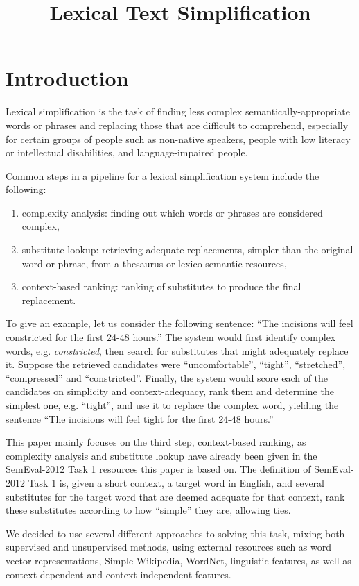 \documentclass[10pt, a4paper]{article}
\title{Lexical Text Simplification}
\begin{document}
\maketitleabstract

\section{Introduction}

Lexical simplification is the task of finding  less complex semantically-appropriate words or phrases and replacing those that are difficult to comprehend, especially for certain groups of people such as non-native speakers, people with low literacy or intellectual disabilities, and language-impaired people.

Common steps in a pipeline for a lexical simplification system include the following:
\begin{enumerate}
\item complexity analysis: finding out which words or phrases are considered complex,
\item substitute lookup: retrieving adequate replacements, simpler than the original word or phrase, from a thesaurus or lexico-semantic resources,
\item context-based ranking: ranking of substitutes to produce the final replacement.
\end{enumerate}

To give an example, let us consider the following sentence: ``The incisions will feel constricted for the first 24-48 hours.'' The system would first identify complex words, e.g. \textit{constricted}, then search for substitutes that might adequately replace it. Suppose the retrieved candidates were ``uncomfortable'', ``tight'', ``stretched'', ``compressed'' and ``constricted''. Finally, the system would score each of the candidates on simplicity and context-adequacy, rank them and determine the simplest one, e.g. ``tight'', and use it to replace the complex word, yielding the sentence ``The incisions will feel tight for the first 24-48 hours.''

This paper mainly focuses on the third step, context-based ranking, as complexity analysis and substitute lookup have already been given in the SemEval-2012 Task 1 resources this paper is based on. The definition of SemEval-2012 Task 1 is, given a short context, a target word in English, and several substitutes for the target word that are deemed adequate for that context, rank these substitutes according to how “simple” they are, allowing ties.

We decided to use several different approaches to solving this task, mixing both supervised and unsupervised methods, using external resources such as word vector representations, Simple Wikipedia, WordNet, linguistic features, as well as context-dependent and context-independent features.
\end{document}
